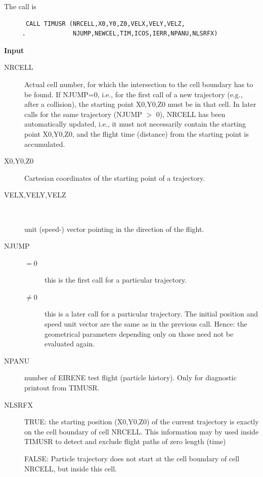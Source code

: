 The call is 

\begin{lstlisting}
      CALL TIMUSR (NRCELL,X0,Y0,Z0,VELX,VELY,VELZ,
     .             NJUMP,NEWCEL,TIM,ICOS,IERR,NPANU,NLSRFX)
\end{lstlisting} 

\textbf{Input} 

\begin{description}
  \item[NRCELL] Actual cell number, for which the
        intersection to the cell boundary has to be found.
        If NJUMP=0, i.e., for the first call of a new trajectory (e.g., after a
        collision), the starting point X0,Y0,Z0 must be in that cell.
        In later calls for the same trajectory (NJUMP $>$ 0), NRCELL has been
        automatically updated, i.e., it must not necessarily contain the starting point
        X0,Y0,Z0, and the flight time (distance) from the starting point is
        accumulated.
  \item[X0,Y0,Z0] Cartesian coordinates of the starting point of a trajectory.
  \item[VELX,VELY,VELZ]~ 

        unit (speed-) vector pointing in the direction of the flight.
  \item[NJUMP]
        \begin{description}
          \item[$= 0$] this is the first call for a
                particular trajectory.
          \item[$\neq 0$] this is a later call for a particular trajectory.
                The initial position and speed unit vector are the same as in the previous
                call.
                Hence: the geometrical parameters depending only on those need not be evaluated
                again.
        \end{description}
  \item[NPANU] number of EIRENE test flight (particle history).
        Only for diagnostic printout from TIMUSR.
  \item[NLSRFX] TRUE:  the starting position (X0,Y0,Z0) of the current trajectory
        is exactly on the cell boundary of cell NRCELL.
        This information may by used inside TIMUSR to detect and exclude flight paths
        of zero length (time) 

        FALSE:	Particle trajectory does not start at the cell boundary of cell NRCELL,
        but inside this cell.
\end{description}

